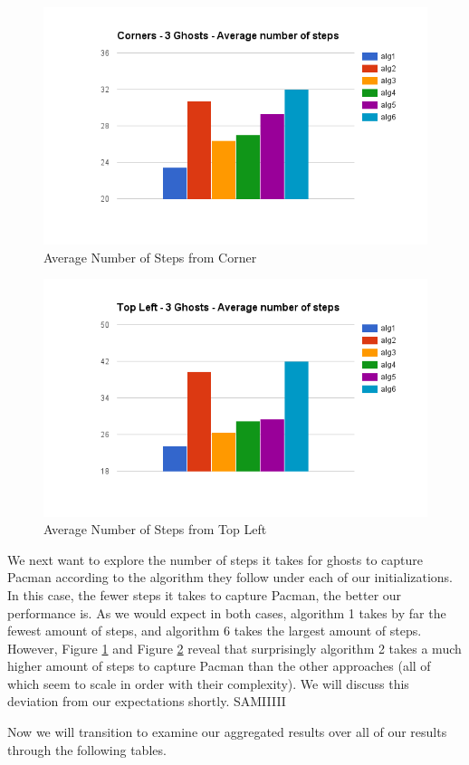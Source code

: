 \documentclass[11pt]{article}
\begin{document}
\begin{multicols}{2}
\begin{figure}[H]
	\includegraphics[width=\columnwidth]{cornersteps.png}
	\caption{Average Number of Steps from Corner}
	\label{fig:averagenumstepscorner}
\end{figure}

\begin{figure}[H]
	\includegraphics[width=\columnwidth]{leftsteps.png}
	\caption{Average Number of Steps from Top Left}
	\label{fig:averagenumstepsleft}
\end{figure}

We next want to explore the number of steps it takes for ghosts to capture Pacman according to the algorithm they follow under each of our initializations. In this case, the fewer steps it takes to capture Pacman, the better our performance is. As we would expect in both cases, algorithm 1 takes by far the fewest amount of steps, and algorithm 6 takes the largest amount of steps. However, Figure \ref{fig:averagenumstepscorner} and Figure \ref{fig:averagenumstepsleft} reveal that surprisingly algorithm 2 takes a much higher amount of steps to capture Pacman than the other approaches (all of which seem to scale in order with their complexity). We will discuss this deviation from our expectations shortly. SAMIIIII

Now we will transition to examine our aggregated results over all of our results through the following tables. 

\end{multicols}
\end{document}
